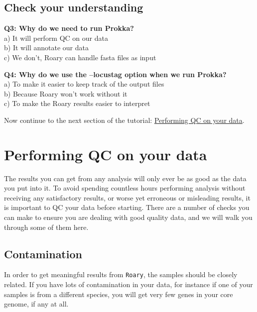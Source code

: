 \documentclass[11pt]{article}
\begin{document}
\hypertarget{check-your-understanding}{%
\subsection{Check your understanding}\label{check-your-understanding}}

\textbf{Q3: Why do we need to run Prokka?}\\
a) It will perform QC on our data\\
b) It will annotate our data\\
c) We don't, Roary can handle fasta files as input

\textbf{Q4: Why do we use the --locustag option when we run Prokka?}\\
a) To make it easier to keep track of the output files\\
b) Because Roary won't work without it\\
c) To make the Roary results easier to interpret

Now continue to the next section of the tutorial:
\href{qc.ipynb}{Performing QC on your data}.





\newpage





    \hypertarget{performing-qc-on-your-data}{%
\section{Performing QC on your data}\label{performing-qc-on-your-data}}

The results you can get from any analysis will only ever be as good as
the data you put into it. To avoid spending countless hours performing
analysis without receiving any satisfactory results, or worse yet
erroneous or misleading results, it is important to QC your data before
starting. There are a number of checks you can make to ensure you are
dealing with good quality data, and we will walk you through some of
them here.

\hypertarget{contamination}{%
\subsection{Contamination}\label{contamination}}

In order to get meaningful results from \texttt{Roary}, the samples
should be closely related. If you have lots of contamination in your
data, for instance if one of your samples is from a different species,
you will get very few genes in your core genome, if any at all.
\end{document}
